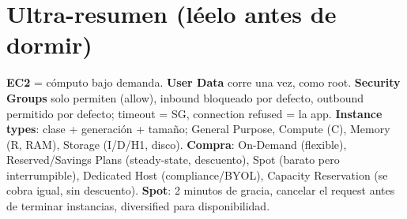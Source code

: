 \documentclass[11pt,a4paper]{article}
\let\oldsection\section
\renewcommand{\section}{\Needspace{9\baselineskip}\oldsection}
\begin{document}
\section*{Ultra-resumen (léelo antes de dormir)}
\begin{tcolorbox}[colback=softgray, colframe=awsdark, boxrule=0.8pt, arc=2pt]
\textbf{EC2} = cómputo bajo demanda. \textbf{User Data} corre una vez, como root. \textbf{Security Groups} solo permiten (allow), inbound bloqueado por defecto, outbound permitido por defecto; timeout = SG, connection refused = la app. \textbf{Instance types}: clase + generación + tamaño; General Purpose, Compute (C), Memory (R, RAM), Storage (I/D/H1, disco). \textbf{Compra}: On-Demand (flexible), Reserved/Savings Plans (steady-state, descuento), Spot (barato pero interrumpible), Dedicated Host (compliance/BYOL), Capacity Reservation (se cobra igual, sin descuento). \textbf{Spot}: 2 minutos de gracia, cancelar el request antes de terminar instancias, diversified para disponibilidad.
\end{tcolorbox}
\end{document}
